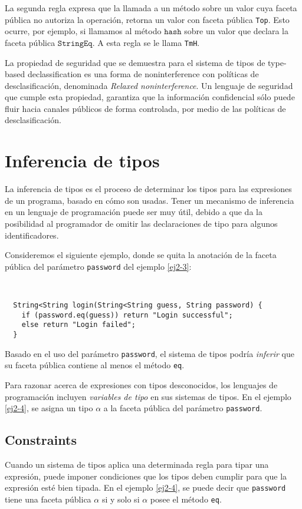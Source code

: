La segunda regla expresa que la llamada a un método sobre un valor cuya faceta pública no autoriza la operación, retorna un valor con faceta pública \texttt{Top}. Esto ocurre, por ejemplo, si llamamos al método $\mathtt{hash}$ sobre un valor que declara la faceta pública $\mathtt{StringEq}$. A esta regla se le llama \texttt{TmH}.

La propiedad de seguridad que se demuestra para el sistema de tipos de type-based declassification es una forma de noninterference con políticas de desclasificación, denominada \emph{Relaxed noninterference}. Un lenguaje de seguridad que cumple esta propiedad, garantiza que la información confidencial sólo puede fluir hacia canales públicos de forma controlada, por medio de las políticas de desclasificación.

\section{Inferencia de tipos} \label{inference}
La inferencia de tipos es el proceso de determinar los tipos para las expresiones de un programa, basado en cómo son usadas. Tener un mecanismo de inferencia en un lenguaje de programación puede ser muy útil, debido a que da la posibilidad al programador de omitir las declaraciones de tipo para algunos identificadores.

Consideremos el siguiente ejemplo, donde se quita la anotación de la faceta pública del parámetro \texttt{password} del ejemplo \ref{ej2-3}:

\begin{ej} \ \\
  \normalfont
  \label{ej2-4}
\begin{lstlisting}
  String<String login(String<String guess, String password) {
  	if (password.eq(guess)) return "Login successful";
  	else return "Login failed";
  }
\end{lstlisting}
\end{ej}

Basado en el uso del parámetro \texttt{password}, el sistema de tipos podría \emph{inferir} que su faceta pública contiene al menos el método \texttt{eq}.

Para razonar acerca de expresiones con tipos desconocidos, los lenguajes de programación incluyen \emph{variables de tipo} en sus sistemas de tipos. En el ejemplo \ref{ej2-4}, se asigna un tipo $\mathtt{\alpha}$ a la faceta pública del parámetro \texttt{password}.

\subsection{Constraints} \label{constraints}
Cuando un sistema de tipos aplica una determinada regla para tipar una expresión, puede imponer condiciones que los tipos deben cumplir para que la expresión esté bien tipada. En el ejemplo \ref{ej2-4}, se puede decir que \texttt{password} tiene una faceta pública $\mathtt{\alpha}$ si y solo si $\mathtt{\alpha}$ posee el método \texttt{eq}.

